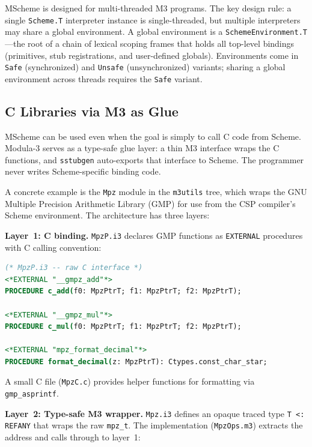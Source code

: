 \documentclass[11pt]{article}
\begin{document}
MScheme is designed for multi-threaded M3 programs.  The key design
rule: a single \texttt{Scheme.T} interpreter instance is
single-threaded, but multiple interpreters may share a global
environment.  A global environment is a
\texttt{SchemeEnvironment.T}---the root of a chain of lexical scoping
frames that holds all top-level bindings (primitives, stub
registrations, and user-defined globals).  Environments come in
\texttt{Safe} (synchronized) and \texttt{Unsafe} (unsynchronized)
variants; sharing a global environment across threads requires the
\texttt{Safe} variant.


\subsection{C Libraries via M3 as Glue}
\label{sec:c-libraries}

MScheme can be used even when the goal is simply to call C code from
Scheme.  Modula-3 serves as a type-safe glue layer: a thin M3
interface wraps the C functions, and \texttt{sstubgen} auto-exports
that interface to Scheme.  The programmer never writes
Scheme-specific binding code.

A concrete example is the \texttt{Mpz} module in the \texttt{m3utils}
tree, which wraps the GNU Multiple Precision Arithmetic Library (GMP)
for use from the CSP compiler's Scheme environment.  The architecture
has three layers:

\textbf{Layer~1: C binding.}  \texttt{MpzP.i3} declares GMP functions
as \texttt{EXTERNAL} procedures with C calling convention:

\begin{lstlisting}[language=Modula3]
(* MpzP.i3 -- raw C interface *)
<*EXTERNAL "__gmpz_add"*>
PROCEDURE c_add(f0: MpzPtrT; f1: MpzPtrT; f2: MpzPtrT);

<*EXTERNAL "__gmpz_mul"*>
PROCEDURE c_mul(f0: MpzPtrT; f1: MpzPtrT; f2: MpzPtrT);

<*EXTERNAL "mpz_format_decimal"*>
PROCEDURE format_decimal(z: MpzPtrT): Ctypes.const_char_star;
\end{lstlisting}

A small C file (\texttt{MpzC.c}) provides helper functions for
formatting via \texttt{gmp\_asprintf}.

\textbf{Layer~2: Type-safe M3 wrapper.}  \texttt{Mpz.i3} defines an
opaque traced type \texttt{T <: REFANY} that wraps the raw
\texttt{mpz\_t}.  The implementation (\texttt{MpzOps.m3}) extracts the
address and calls through to layer~1:
\end{document}
